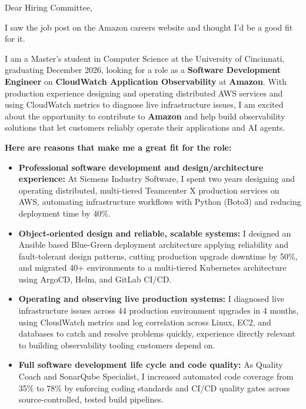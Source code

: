 \documentclass[11pt]{letter}
\date{}
\begin{document}
\begin{letter}{}

\opening{Dear Hiring Committee,}

I saw the job post on the Amazon careers website and thought I'd be a good fit for it.

I am a Master's student in Computer Science at the University of Cincinnati, graduating December 2026, looking for a role as a \textbf{Software Development Engineer} on \textbf{CloudWatch Application Observability} at \textbf{Amazon}. With production experience designing and operating distributed AWS services and using CloudWatch metrics to diagnose live infrastructure issues, I am excited about the opportunity to contribute to \textbf{Amazon} and help build observability solutions that let customers reliably operate their applications and AI agents.

\textbf{Here are reasons that make me a great fit for the role:}

\begin{itemize}[leftmargin=*, itemsep=0.45em]
    \item \textbf{Professional software development and design/architecture experience:} At Siemens Industry Software, I spent two years designing and operating distributed, multi-tiered Teamcenter X production services on AWS, automating infrastructure workflows with Python (Boto3) and reducing deployment time by 40\%.

    \item \textbf{Object-oriented design and reliable, scalable systems:} I designed an Ansible based Blue-Green deployment architecture applying reliability and fault-tolerant design patterns, cutting production upgrade downtime by 50\%, and migrated 40+ environments to a multi-tiered Kubernetes architecture using ArgoCD, Helm, and GitLab CI/CD.

    \item \textbf{Operating and observing live production systems:} I diagnosed live infrastructure issues across 44 production environment upgrades in 4 months, using CloudWatch metrics and log correlation across Linux, EC2, and databases to catch and resolve problems quickly, experience directly relevant to building observability tooling customers depend on.

    \item \textbf{Full software development life cycle and code quality:} As Quality Coach and SonarQube Specialist, I increased automated code coverage from 35\% to 78\% by enforcing coding standards and CI/CD quality gates across source-controlled, tested build pipelines.


\end{itemize}
\end{letter}
\end{document}
